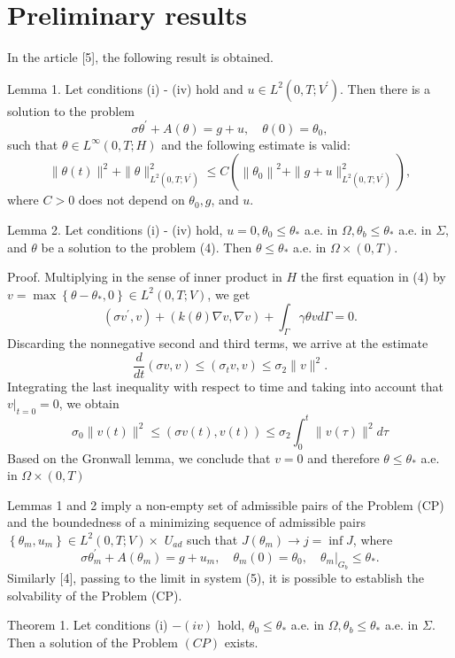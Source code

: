 \documentclass[10pt]{article}
\begin{document}
\section{Preliminary results}
In the article [5], the following result is obtained.

Lemma 1. Let conditions (i) - (iv) hold and $u \in L^{2}\left(0, T ; V^{\prime}\right)$. Then there is a solution to the problem
$$
\sigma \theta^{\prime}+A(\theta)=g+u, \quad \theta(0)=\theta_{0},
$$
such that $\theta \in L^{\infty}(0, T ; H)$ and the following estimate is valid:
$$
\|\theta(t)\|^{2}+\|\theta\|_{L^{2}\left(0, T ; V^{\prime}\right)}^{2} \leq C\left(\left\|\theta_{0}\right\|^{2}+\|g+u\|_{L^{2}\left(0, T ; V^{\prime}\right)}^{2}\right),
$$
where $C>0$ does not depend on $\theta_{0}, g$, and $u$.

Lemma 2. Let conditions (i) - (iv) hold, $u=0, \theta_{0} \leq \theta_{*}$ a.e. in $\Omega, \theta_{b} \leq \theta_{*}$ a.e. in $\Sigma$, and $\theta$ be a solution to the problem (4). Then $\theta \leq \theta_{*}$ a.e. in $\Omega \times(0, T)$.

Proof. Multiplying in the sense of inner product in $H$ the first equation in (4) by $v=\max \left\{\theta-\theta_{*}, 0\right\} \in L^{2}(0, T ; V)$, we get
$$
\left(\sigma v^{\prime}, v\right)+(k(\theta) \nabla v, \nabla v)+\int_{\Gamma} \gamma \theta v d \Gamma=0 .
$$
Discarding the nonnegative second and third terms, we arrive at the estimate
$$
\frac{d}{d t}(\sigma v, v) \leq\left(\sigma_{t} v, v\right) \leq \sigma_{2}\|v\|^{2} .
$$
Integrating the last inequality with respect to time and taking into account that $\left.v\right|_{t=0}=0$, we obtain
$$
\sigma_{0}\|v(t)\|^{2} \leq(\sigma v(t), v(t)) \leq \sigma_{2} \int_{0}^{t}\|v(\tau)\|^{2} d \tau
$$
Based on the Gronwall lemma, we conclude that $v=0$ and therefore $\theta \leq \theta_{*}$ a.e. in $\Omega \times(0, T)$

Lemmas 1 and 2 imply a non-empty set of admissible pairs of the Problem (CP) and the boundedness of a minimizing sequence of admissible pairs $\left\{\theta_{m}, u_{m}\right\} \in L^{2}(0, T ; V) \times$ $U_{a d}$ such that $J\left(\theta_{m}\right) \rightarrow j=\inf J$, where
$$
\sigma \theta_{m}^{\prime}+A\left(\theta_{m}\right)=g+u_{m}, \quad \theta_{m}(0)=\theta_{0},\left.\quad \theta_{m}\right|_{G_{b}} \leq \theta_{*} .
$$
Similarly [4], passing to the limit in system (5), it is possible to establish the solvability of the Problem (CP).

Theorem 1. Let conditions (i) $-(i v)$ hold, $\theta_{0} \leq \theta_{*}$ a.e. in $\Omega, \theta_{b} \leq \theta_{*}$ a.e. in $\Sigma$. Then a solution of the Problem $(C P)$ exists.
\end{document}
